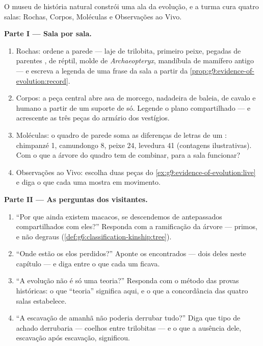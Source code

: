 \begin{problem}\label{pb:g9:evidence-of-evolution:1}
O museu de história natural constrói uma ala da evolução, e a
turma cura quatro salas: Rochas, Corpos, Moléculas e
Observações ao Vivo.

\medskip\noindent\textbf{Parte I --- Sala por sala.}
\begin{enumerate}
  \item Rochas: ordene a parede --- laje de trilobita,
        primeiro peixe, pegadas de parentes ,
         de réptil, molde de \emph{Archaeopteryx},
        mandíbula de mamífero antigo --- e escreva a legenda
        de uma frase da sala a partir da
        \cref{prop:g9:evidence-of-evolution:record}.
  \item Corpos: a peça central abre asa de morcego, nadadeira
        de baleia,  de cavalo e  humano a partir de
        um suporte de  só. Legende o plano
        compartilhado --- e acrescente as três peças do
        armário dos vestígios.
  \item Moléculas: o quadro de parede soma as diferenças de
        letras de um : chimpanzé 1, camundongo 8, peixe
        24, levedura 41 (contagens ilustrativas). Com o que a
        árvore do quadro tem de combinar, para a sala
        funcionar?
  \item Observações ao Vivo: escolha duas peças do
        \cref{ex:g9:evidence-of-evolution:live} e diga o que
        cada uma mostra em movimento.
\end{enumerate}

\medskip\noindent\textbf{Parte II --- As perguntas dos
visitantes.}
\begin{enumerate}[resume]
  \item ``Por que ainda existem macacos, se descendemos de
        antepassados compartilhados com eles?'' Responda com
        a ramificação da árvore --- primos, e não degraus
        (\cref{def:g6:classification-kinship:tree}).
  \item ``Onde estão os elos perdidos?'' Aponte os
        encontrados --- dois deles neste capítulo --- e diga
        entre o que cada um ficava.
  \item ``A evolução não é só uma teoria?'' Responda com o
        método das provas históricas: o que ``teoria''
        significa aqui, e o que a concordância das quatro
        salas estabelece.
  \item ``A escavação de amanhã não poderia derrubar tudo?''
        Diga que tipo de achado derrubaria --- coelhos entre
        trilobitas --- e o que a ausência dele, escavação
        após escavação, significou.
\end{enumerate}


\end{problem}
